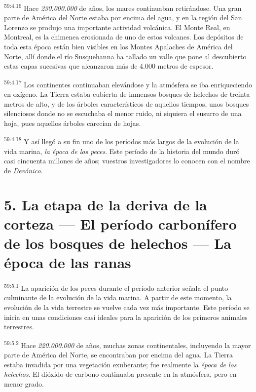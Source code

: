 \par
\textsuperscript{59:4.16} Hace \textit{230.000.000} de años, los mares continuaban retirándose. Una gran parte de América del Norte estaba por encima del agua, y en la región del San Lorenzo se produjo una importante actividad volcánica. El Monte Real, en Montreal, es la chimenea erosionada de uno de estos volcanes. Los depósitos de toda esta época están bien visibles en los Montes Apalaches de América del Norte, allí donde el río Susquehanna ha tallado un valle que pone al descubierto estas capas sucesivas que alcanzaron más de 4.000 metros de espesor.

\par
\textsuperscript{59:4.17} Los continentes continuaban elevándose y la atmósfera se iba enriqueciendo en oxígeno. La Tierra estaba cubierta de inmensos bosques de helechos de treinta metros de alto, y de los árboles característicos de aquellos tiempos, unos bosques silenciosos donde no se escuchaba el menor ruido, ni siquiera el susurro de una hoja, pues aquellos árboles carecían de hojas.

\par
\textsuperscript{59:4.18} Y así llegó a su fin uno de los períodos más largos de la evolución de la vida marina, \textit{la época de los peces}. Este período de la historia del mundo duró casi cincuenta millones de años; vuestros investigadores lo conocen con el nombre de \textit{Devónico}.

\section*{5. La etapa de la deriva de la corteza --- El período carbonífero de los bosques de helechos --- La época de las ranas }
\par
\textsuperscript{59:5.1} La aparición de los peces durante el período anterior señala el punto culminante de la evolución de la vida marina. A partir de este momento, la evolución de la vida terrestre se vuelve cada vez más importante. Este período se inicia en unas condiciones casi ideales para la aparición de los primeros animales terrestres.

\par
\textsuperscript{59:5.2} Hace \textit{220.000.000} de años, muchas zonas continentales, incluyendo la mayor parte de América del Norte, se encontraban por encima del agua. La Tierra estaba invadida por una vegetación exuberante; fue realmente la \textit{época de los helechos}. El dióxido de carbono continuaba presente en la atmósfera, pero en menor grado.

